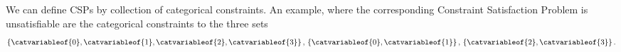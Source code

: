 \begin{remark}
    We can define CSPs by collection of categorical constraints.
    An example, where the corresponding Constraint Satisfaction Problem is unsatisfiable are the categorical constraints to the three sets
    \[ \{\catvariableof{0},\catvariableof{1},\catvariableof{2},\catvariableof{3}\} \, , \, \{\catvariableof{0},\catvariableof{1}\}\, ,\,\{\catvariableof{2},\catvariableof{3}\} \, . \]
\end{remark}



